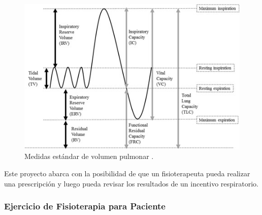 \documentclass[12pt]{article}
\begin{document}
\begin{figure}[ht]
\centering
\includegraphics[scale=0.6]{imag/volumeslung.jpeg}
\caption{Medidas estándar de volumen pulmonar \cite{18}. }
\label{3}
\end{figure}
\FloatBarrier



Este proyecto abarca con la posibilidad de que un fisioterapeuta pueda realizar una prescripción y luego pueda revisar los resultados de un incentivo respiratorio.

\subsubsection{Ejercicio de Fisioterapia para Paciente}





\end{document}
